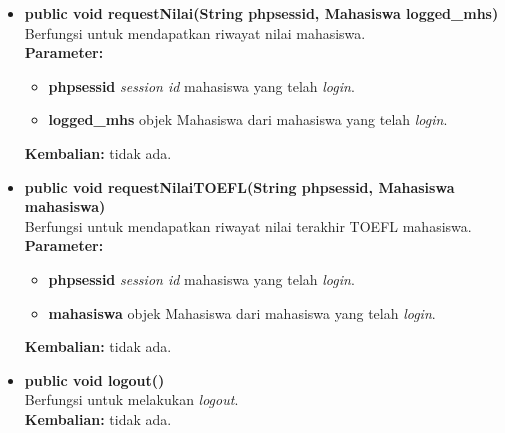 \begin{enumerate}
\begin{enumerate}
\begin{itemize}
					\item \textbf{public void requestNilai(String phpsessid, Mahasiswa logged\_mhs)}\\
					Berfungsi untuk mendapatkan riwayat nilai mahasiswa.\\
					\textbf{Parameter:}
					\begin{itemize}
						\item \textbf{phpsessid} \textit{session id} mahasiswa yang telah \textit{login}.
						\item \textbf{logged\_mhs} objek Mahasiswa dari mahasiswa yang telah \textit{login}.
					\end{itemize}
					\textbf{Kembalian:} tidak ada.
				
				\item \textbf{public void requestNilaiTOEFL(String phpsessid, Mahasiswa mahasiswa)}\\
					Berfungsi untuk mendapatkan riwayat nilai terakhir TOEFL mahasiswa.\\
					\textbf{Parameter:}
					\begin{itemize}
						\item \textbf{phpsessid} \textit{session id} mahasiswa yang telah \textit{login}.
						\item \textbf{mahasiswa} objek Mahasiswa dari mahasiswa yang telah \textit{login}.
					\end{itemize}
					\textbf{Kembalian:} tidak ada.
			
				\item \textbf{public void logout()}\\
					Berfungsi untuk melakukan \textit{logout}.\\
					\textbf{Kembalian:} tidak ada.
				

\end{itemize}
\end{enumerate}
\end{enumerate}
